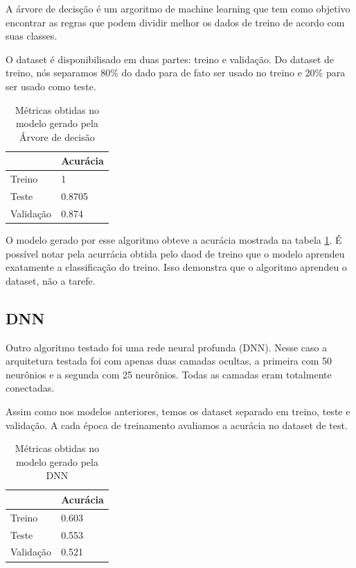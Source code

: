 \documentclass[a4paper,10pt]{article}
\begin{document}
A árvore de decisção é um argoritmo de machine learning que tem como objetivo encontrar as regras que podem dividir melhor os dados de treino de acordo com suas classes. 

O dataset é disponibilisado em duas partes: treino e validação. Do dataset de treino, nós separamos 80\% do dado para de fato ser usado no treino e 20\% para ser usado como teste.

\begin{table}[h!]
\centering
\begin{tabular}{l||l}

            &   Acurácia    \\ \hline
Treino      &   1           \\ \hline
Teste       &   0.8705      
\\ \hline
Validação   &   0.874
\end{tabular}
\caption{Métricas obtidas no modelo gerado pela Árvore de decisão}
  \label{tab:metrica_dt}
\end{table}

O modelo gerado por esse algoritmo obteve a acurácia mostrada na tabela \ref{tab:metrica_dt}. É possível notar pela acurrácia obtida pelo daod de treino que o modelo aprendeu exatamente a classificação do treino. Isso demonstra que o algoritmo aprendeu o dataset, não a tarefe.

\subsection{DNN}

Outro algoritmo testado foi uma rede neural profunda (DNN). Nesse caso a arquitetura testada foi com apenas duas camadas ocultas, a primeira com 50 neurônios e a segunda com 25 neurônios. Todas as camadas eram totalmente conectadas.

Assim como nos modelos anteriores, temos os dataset separado em treino, teste e validação. A cada época de treinamento avaliamos a acurácia no dataset de test. 

\begin{table}[h!]
\centering
\begin{tabular}{l||l}

            &   Acurácia    \\ \hline
Treino      &   0.603           \\ \hline
Teste       &   0.553      
\\ \hline
 Validação   &   0.521
\end{tabular}
\caption{Métricas obtidas no modelo gerado pela DNN}
  \label{tab:metrica_dnn}
\end{table}
\end{document}
